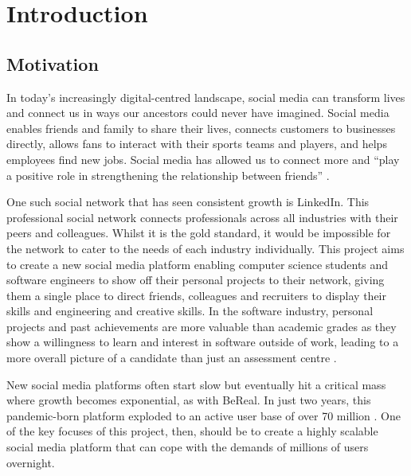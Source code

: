 \chapter{Introduction}
\label{cha:intro}

\section{Motivation}
In today's increasingly digital-centred landscape, social media can transform lives and connect us in ways our ancestors could never have imagined.
Social media enables friends and family to share their lives, connects customers to businesses directly, allows fans to interact with their sports teams and players, and helps employees find new jobs. 
Social media has allowed us to connect more and ``play a positive role in strengthening the relationship between friends'' \citep{chen2017social}. 

One such social network that has seen consistent growth is LinkedIn. This professional social network connects professionals across all industries with their peers and colleagues.
Whilst it is the gold standard, it would be impossible for the network to cater to the needs of each industry individually.
This project aims to create a new social media platform enabling computer science students and software engineers to show off their personal projects to their network, giving them a single place to direct friends, colleagues and recruiters to display their skills and engineering and creative skills. 
In the software industry, personal projects and past achievements are more valuable than academic grades as they show a willingness to learn and interest in software outside of work, leading to a more overall picture of a candidate than just an assessment centre \citep{stepanova2021hiring}.

New social media platforms often start slow but eventually hit a critical mass where growth becomes exponential, as with BeReal.
In just two years, this pandemic-born platform exploded to an active user base of over 70 million \citep{curry2025bereal}. One of the key focuses of this project, then, should be to create a highly scalable social media platform that can cope with the demands of millions of users overnight.

